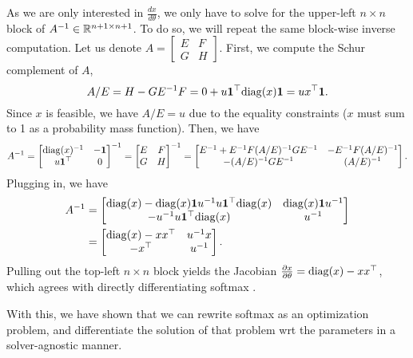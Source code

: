 \documentclass[11pt]{article}
\begin{document}
As we are only interested in $\frac{dx}{d\theta}$,
we only have to solve for the upper-left $n\times n$ block of $A^{-1}\in\mathbb{R}^{n+1\times n+1}$.
To do so, we will repeat the same block-wise inverse computation.
Let us denote $A = \begin{bmatrix}E & F \\ G & H\end{bmatrix}$.
First, we compute the Schur complement of $A$,
\begin{equation}
A/E = H - GE^{-1}F = 0 + u\mathbf{1}^\top\mathrm{diag}(x)\mathbf{1} = ux^\top\mathbf{1}.
\end{equation}
Since $x$ is feasible, we have $A/E = u$ due to the equality constraints
($x$ must sum to 1 as a probability mass function).
Then, we have
\begin{equation}
A^{-1} = \begin{bmatrix}
\mathrm{diag}(x)^{-1} & -\mathbf{1}\\
u\mathbf{1}^\top & 0
\end{bmatrix}^{-1}
=\begin{bmatrix}E & F \\ G & H\end{bmatrix}^{-1}
= \begin{bmatrix}
E^{-1} + E^{-1}F(A/E)^{-1}GE^{-1} & -E^{-1}F(A/E)^{-1}\\
-(A/E)^{-1}GE^{-1} & (A/E)^{-1}
\end{bmatrix}.
\end{equation}
Plugging in, we have
\begin{equation}
\begin{aligned}
A^{-1} 
&= \begin{bmatrix}
\mathrm{diag}(x) - \mathrm{diag}(x)\mathbf{1}u^{-1}u\mathbf{1}^\top\mathrm{diag}(x)
    & \mathrm{diag}(x)\mathbf{1}u^{-1}\\
-u^{-1}u\mathbf{1}^\top \mathrm{diag}(x) & u^{-1}
\end{bmatrix}\\
&= \begin{bmatrix}
\mathrm{diag}(x) - xx^\top
    & u^{-1}x\\
    -x^\top & u^{-1}
\end{bmatrix}.
\end{aligned}
\end{equation}
Pulling out the top-left $n\times n$ block yields
the Jacobian $\frac{\partial x}{\partial \theta} = \mathrm{diag}(x) - xx^\top$,
which agrees with directly differentiating softmax \citep{sparsemax}.

With this, we have shown that we can rewrite softmax as an optimization problem,
and differentiate the solution of that problem wrt the parameters in a solver-agnostic
manner.
\end{document}
